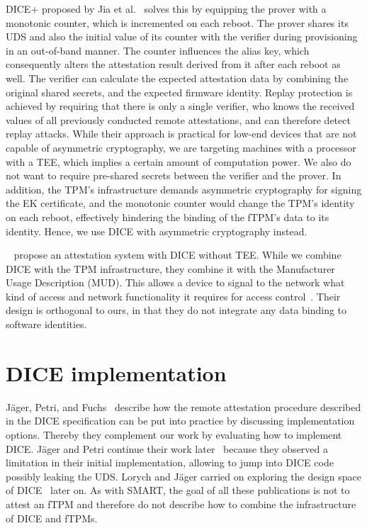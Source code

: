 DICE+ proposed by Jia et al.~\cite{Jia2020} solves this by equipping the prover with a monotonic counter, which is incremented on each reboot.
The prover shares its UDS and also the initial value of its counter with the verifier during provisioning in an out-of-band manner.
The counter influences the alias key, which consequently alters the attestation result derived from it after each reboot as well.
The verifier can calculate the expected attestation data by combining the original shared secrets, and the expected firmware identity.
Replay protection is achieved by requiring that there is only a single verifier, who knows the received values of all previously conducted remote attestations, and can therefore detect replay attacks.
While their approach is practical for low-end devices that are not capable of asymmetric cryptography, we are targeting machines with a processor with a \ac{TEE}, which implies a certain amount of computation power.
We also do not want to require pre-shared secrets between the verifier and the prover.
In addition, the TPM's infrastructure demands asymmetric cryptography for signing the EK certificate, and the monotonic counter would change the TPM's identity on each reboot, effectively hindering the binding of the fTPM's data to its identity.
Hence, we use DICE with asymmetric cryptography instead.

~\cite{Bravi2023} propose an attestation system with DICE without TEE\@.
While we combine DICE with the TPM infrastructure, they combine it with the Manufacturer Usage Description (MUD).
This allows a device to signal to the network what kind of access and network functionality it requires for access control~\cite{Lear2019}.
Their design is orthogonal to ours, in that they do not integrate any data binding to software identities.

\section{DICE implementation}

Jäger, Petri, and Fuchs~\cite{Jaeger2017} describe how the remote attestation procedure described in the DICE specification can be put into practice by discussing implementation options.
Thereby they complement our work by evaluating how to implement \ac{DICE}\@.
Jäger and Petri continue their work later~\cite{Jaeger2020} because they observed a limitation in their initial implementation, allowing to jump into \ac{DICE} code possibly leaking the \ac{UDS}.
Lorych and Jäger carried on exploring the design space of DICE~\cite{Lorych2022} later on.
As with SMART, the goal of all these publications is not to attest an \ac{fTPM} and therefore do not describe how to combine the infrastructure of DICE and \acp{fTPM}.

